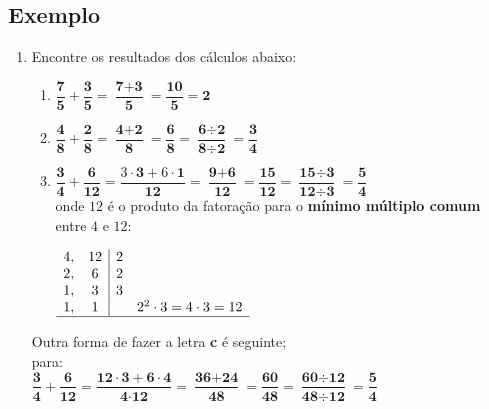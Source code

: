 	\subsection{Exemplo}
	\begin{enumerate}
	\item Encontre os resultados dos cálculos abaixo:
		\begin{enumerate}[label=\alph*)]
			\item  $\dfrac{\textbf{7}}{\textbf{5}} + \dfrac{\textbf{3}}{\textbf{5}} = \dfrac{\textbf{7} + \textbf{3}}{\textbf{5}} = \dfrac{\textbf{10}}{\textbf{5}} = \textbf{2}$\\
			
			\item  $\dfrac{\textbf{4}}{\textbf{8}} + \dfrac{\textbf{2}}{\textbf{8}} = \dfrac{\textbf{4} + \textbf{2}}{\textbf{8}} = \dfrac{\textbf{6}}{\textbf{8}} = \dfrac{\textbf{6}\div\textbf{2}}{\textbf{8}\div\textbf{2}} = \dfrac{\textbf{3}}{\textbf{4}}$\\
			
			\item  $\dfrac{\textbf{3}}{\textbf{4}} + \dfrac{\textbf{6}}{\textbf{12}} = \dfrac{3\cdot\textbf{3} + 6\cdot\textbf{1}}{\textbf{12}} = \dfrac{\textbf{9} + \textbf{6}}{\textbf{12}} = \dfrac{\textbf{15}}{\textbf{12}} = \dfrac{\textbf{15}\div\textbf{3}}{\textbf{12}\div\textbf{3}} = \dfrac{\textbf{5}}{\textbf{4}}$ \\
			
			onde $12$ é o produto da fatoração para o \textbf{mínimo múltiplo comum} entre $4$ e $12$:
			
			$\begin{array}{cc|cc}
			4, & 12 & 2 & \\ 
			2, & 6 & 2 & \\
			1, & 3 & 3 & \\
			1, & 1 &  & 2^{2} \cdot 3 = 4 \cdot 3 = 12 \\
			\hline 
			\end{array}$ \\
				\end{enumerate}
						
			Outra forma de fazer a letra \textbf{c} é seguinte; \\ 
			para: \\
			
			 $ \dfrac{\textbf{3}}{\textbf{4}} + \dfrac{\textbf{6}}{\textbf{12}} = \dfrac{\textbf{12}\cdot\textbf{3} + \textbf{6}\cdot\textbf{4}}{\textbf{4}\cdot\textbf{12}} = \dfrac{\textbf{36} + \textbf{24}}{\textbf{48}} = \dfrac{\textbf{60}}{\textbf{48}} = \dfrac{\textbf{60}\div\textbf{12}}{\textbf{48}\div\textbf{12}} = \dfrac{\textbf{5}}{\textbf{4}}$ \\
			
		
	\end{enumerate}


